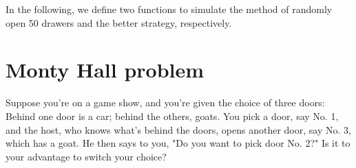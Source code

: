 In the following, we define two functions to simulate the method of randomly open 50 drawers and the better strategy, respectively. 



\hypertarget{Monty-Hall-problem}{%
\section{Monty Hall problem}\label{Monty-Hall-problem}}


Suppose you're on a game show, and you're given the choice of three doors:
Behind one door is a car; behind the others, goats. You pick a door, say No. 1,
and the host, who knows what's behind the doors, opens another door, say No. 3,
which has a goat. He then says to you, "Do you want to pick door No. 2?" Is it
to your advantage to switch your choice?





